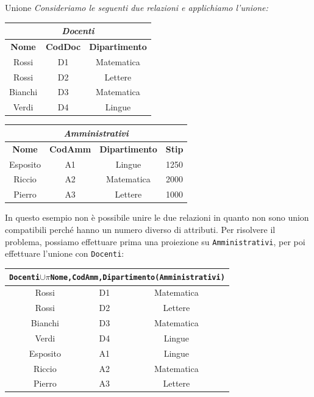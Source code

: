 \begin{Example}{Unione}{}
    \textit{Consideriamo le seguenti due relazioni e applichiamo l'unione:}
    \begin{center}
        \begin{tabular}{|c|c|c|}
            \hline\multicolumn{3}{|c|}{\textit{Docenti}}\\\hline
            \textbf{Nome} & \textbf{CodDoc} & \textbf{Dipartimento}\\\hline
            Rossi & D1 & Matematica\\
            Rossi & D2 & Lettere\\
            Bianchi & D3 & Matematica\\
            Verdi & D4 & Lingue\\\hline
        \end{tabular}
        \begin{tabular}{|c|c|c|c|}
            \hline\multicolumn{4}{|c|}{\textit{Amministrativi}}\\\hline
            \textbf{Nome} & \textbf{CodAmm} & \textbf{Dipartimento} & \textbf{Stip}\\\hline
            Esposito & A1 & Lingue & 1250\\
            Riccio & A2 & Matematica & 2000\\
            Pierro & A3 & Lettere & 1000\\\hline
        \end{tabular}
        \bigskip
    \end{center}
    In questo esempio non è possibile unire le due relazioni in quanto non sono union compatibili perché hanno un numero diverso di attributi. Per risolvere il problema, possiamo effettuare prima una proiezione su \verb|Amministrativi|, per poi effettuare l'unione con \verb|Docenti|:
    \begin{center}
        \begin{tabular}{|c|c|c|}
            \hline\multicolumn{3}{|c|}{\Verb|Docenti|$\cup$$\pi$\scriptsize{\Verb|Nome,CodAmm,Dipartimento|}\normalsize\Verb|(Amministrativi)|}\\\hline
            Rossi & D1 & Matematica\\
            Rossi & D2 & Lettere\\
            Bianchi & D3 & Matematica\\
            Verdi & D4 & Lingue\\
            Esposito & A1 & Lingue\\
            Riccio & A2 & Matematica\\
            Pierro & A3 & Lettere\\\hline
        \end{tabular}
    \end{center}
\end{Example}

